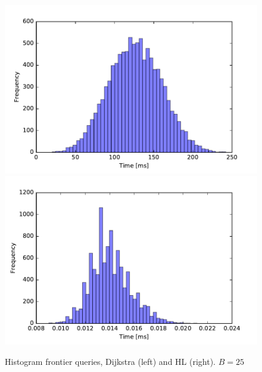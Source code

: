 \begin{figure} \caption{Histogram frontier queries, Dijkstra (left) and HL (right). $B=25$}\label{fig:SF_query}
\begin{center}
\includegraphics[clip, trim=0.6cm 0.3cm 1.2cm 0.8cm,scale=0.3]{TexImg/SF_query_dij_B25.pdf}
\includegraphics[clip, trim=0.9cm 0.3cm 1.1cm 0.8cm,scale=0.3]{TexImg/SF_query_hl_B25.pdf}
\end{center}
\end{figure}



